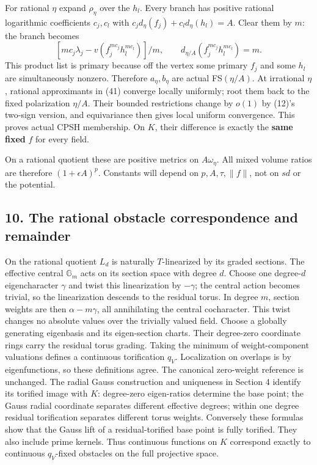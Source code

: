 \documentclass[
  10pt,
]{article}
\begin{document}
For rational \(\eta\) expand \(\rho_\eta\) over the \(h_l\). Every
branch has positive rational logarithmic coefficients \(c_j,c_l\) with
\(c_jd_\eta(f_j)+c_ld_\eta(h_l)=A\). Clear them by \(m\): the branch
becomes \[ [mc_j\lambda_j-v(f_j^{mc_j}h_l^{mc_l})]/m,\qquad
 d_{\eta/A}(f_j^{mc_j}h_l^{mc_l})=m. \] This product list is primary
because off the vertex some primary \(f_j\) and some \(h_l\) are
simultaneously nonzero. Therefore \(a_\eta,b_\eta\) are actual
FS\((\eta/A)\). At irrational \(\eta\), rational approximants in (41)
converge locally uniformly; root them back to the fixed polarization
\(\eta/A\). Their bounded restrictions change by \(o(1)\) by (12)'s
two-sign version, and equivariance then gives local uniform convergence.
This proves actual CPSH membership. On \(K\), their difference is
exactly the \textbf{same fixed} \(f\) for every field.

On a rational quotient these are positive metrics on \(A\omega_\eta\).
All mixed volume ratios are therefore \((1+\epsilon A)^p\). Constants
will depend on \(p,A,\tau,\|f\|\), not on \(sd\) or the potential.

\subsection{10. The rational obstacle correspondence and
remainder}\label{the-rational-obstacle-correspondence-and-remainder}

On the rational quotient \(L_d\) is naturally \(T\)-linearized by its
graded sections. The effective central \(\mathbb G_m\) acts on its
section space with degree \(d\). Choose one degree-\(d\) eigencharacter
\(\gamma\) and twist this linearization by \(-\gamma\); the central
action becomes trivial, so the linearization descends to the residual
torus. In degree \(m\), section weights are then \(\alpha-m\gamma\), all
annihilating the central cocharacter. This twist changes no absolute
values over the trivially valued field. Choose a globally generating
eigenbasis and its eigen-section charts. Their degree-zero coordinate
rings carry the residual torus grading. Taking the minimum of
weight-component valuations defines a continuous torification \(q_V\).
Localization on overlaps is by eigenfunctions, so these definitions
agree. The canonical zero-weight reference is unchanged. The radial
Gauss construction and uniqueness in Section 4 identify its torified
image with \(K\): degree-zero eigen-ratios determine the base point; the
Gauss radial coordinate separates different effective degrees; within
one degree residual torification separates different torus weights.
Conversely these formulas show that the Gauss lift of a
residual-torified base point is fully torified. They also include prime
kernels. Thus continuous functions on \(K\) correspond exactly to
continuous \(q_V\)-fixed obstacles on the full projective space.
\end{document}
